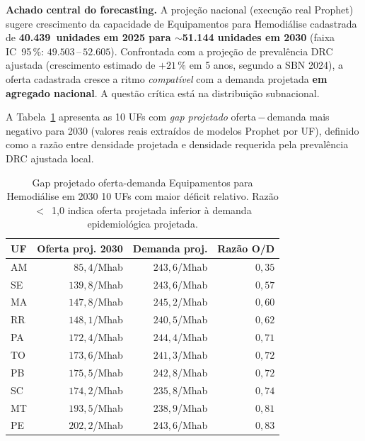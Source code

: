 \documentclass[12pt,a4paper,oneside]{article}
\begin{document}
\textbf{Achado central do forecasting.} A projeção nacional
(execução real Prophet) sugere crescimento da capacidade de
Equipamentos para Hemodiálise cadastrada de
\textbf{40{.}439~unidades em 2025 para $\sim$51{.}144 unidades
em 2030} (faixa IC~95\,\%: $49{.}503$\,--\,$52{.}605$).
Confrontada com a projeção de prevalência DRC ajustada
(crescimento estimado de $+21\,\%$ em 5 anos, segundo a SBN
2024), a oferta cadastrada cresce a ritmo \textit{compatível}
com a demanda projetada \textbf{em agregado nacional}. A questão
crítica está na distribuição subnacional.

A Tabela~\ref{tab:prophet-gap-2030} apresenta as 10 UFs com
\textit{gap projetado} oferta\,$-$\,demanda mais negativo para
2030 (valores reais extraídos de modelos Prophet por UF), definido
como a razão entre densidade projetada e densidade requerida pela
prevalência DRC ajustada local.

\begin{table}[htbp]
\centering
\caption{Gap projetado oferta-demanda Equipamentos para
Hemodiálise em 2030 \textemdash{} 10 UFs com maior déficit
relativo. Razão $<$~1,0 indica oferta projetada inferior à
demanda epidemiológica projetada.}
\label{tab:prophet-gap-2030}
\small
\begin{tabular}{l r r r}
\toprule
\textbf{UF} & \textbf{Oferta proj. 2030} & \textbf{Demanda proj.} &
\textbf{Razão O/D} \\
\midrule
AM & $85{,}4$/Mhab  & $243{,}6$/Mhab & $0{,}35$ \\
SE & $139{,}8$/Mhab & $243{,}6$/Mhab & $0{,}57$ \\
MA & $147{,}8$/Mhab & $245{,}2$/Mhab & $0{,}60$ \\
RR & $148{,}1$/Mhab & $240{,}5$/Mhab & $0{,}62$ \\
PA & $172{,}4$/Mhab & $244{,}4$/Mhab & $0{,}71$ \\
TO & $173{,}6$/Mhab & $241{,}3$/Mhab & $0{,}72$ \\
PB & $175{,}5$/Mhab & $242{,}8$/Mhab & $0{,}72$ \\
SC & $174{,}2$/Mhab & $235{,}8$/Mhab & $0{,}74$ \\
MT & $193{,}5$/Mhab & $238{,}9$/Mhab & $0{,}81$ \\
PE & $202{,}2$/Mhab & $243{,}6$/Mhab & $0{,}83$ \\
\bottomrule
\end{tabular}
\end{table}
\end{document}
